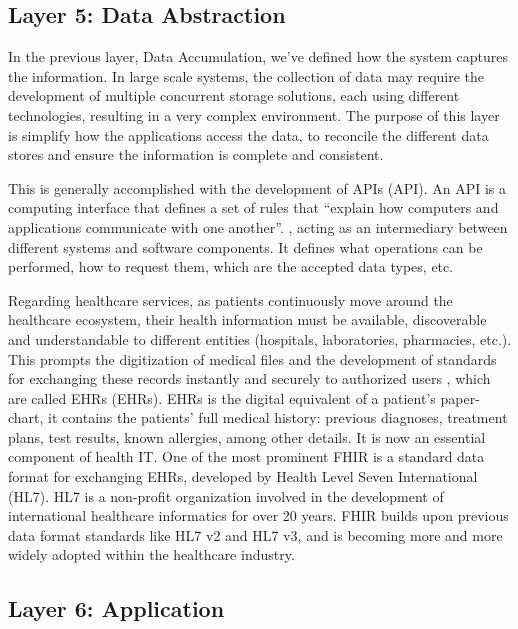 \subsection{Layer 5: Data Abstraction}
\label{sec:iot-model-layer5}


In the previous layer, Data Accumulation, we've defined how the system captures the information. In large scale systems, the collection of data may require the development of multiple concurrent storage solutions, each using different technologies, resulting in a very complex environment. The purpose of this layer is simplify how the applications access the data, to reconcile the different data stores and ensure the information is complete and consistent. 

This is generally accomplished with the development of \acl{API}s (\acs{API}). An \acs{API} is a computing interface that defines a set of rules that ``explain how computers and applications communicate with one another''. \cite{IBMAPI}, acting as an intermediary between different systems and software components. It defines what operations can be performed, how to request them, which are the accepted data types, etc. 

Regarding healthcare services, as patients continuously move around the healthcare ecosystem, their health information must be available, discoverable and understandable to different entities (hospitals, laboratories, pharmacies, etc.). This prompts the digitization of medical files and the development of standards for exchanging these records instantly and securely to authorized users \cite{HL72019}, which are called \acl{EHR}s (\acs{EHR}s). \acs{EHR}s is the digital equivalent of a patient's paper-chart, it contains the patients' full medical history: previous diagnoses, treatment plans, test results, known allergies, among other details. It is now an essential component of health IT. One of the most prominent \acf{FHIR} is a standard data format for exchanging \acs{EHR}s, developed by Health Level Seven International (HL7). HL7 is a non-profit organization involved in the development of international healthcare informatics for over 20 years. \acs{FHIR} builds upon previous data format standards like HL7 v2 and HL7 v3, and is becoming more and more widely adopted within the healthcare industry. 


\subsection{Layer 6: Application}
\label{sec:iot-model-layer6}

